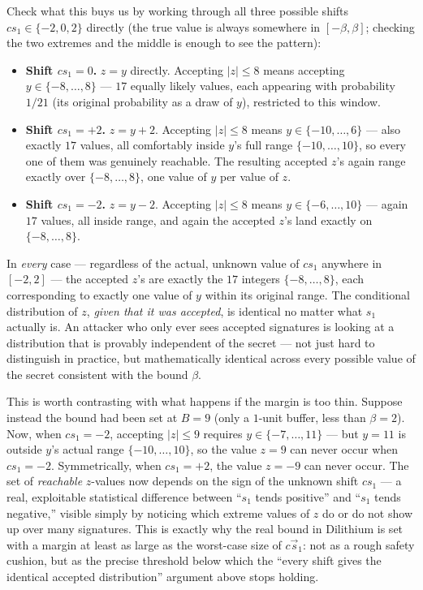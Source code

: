 Check what this buys us by working through all three possible shifts $cs_1 \in \{-2,0,2\}$ directly (the true value is always somewhere in $[-\beta,\beta]$; checking the two extremes and the middle is enough to see the pattern):
\begin{itemize}[leftmargin=*]
  \item \textbf{Shift $cs_1=0$.} $z=y$ directly. Accepting $|z|\le 8$ means accepting $y\in\{-8,\ldots,8\}$ --- $17$ equally likely values, each appearing with probability $1/21$ (its original probability as a draw of $y$), restricted to this window.
  \item \textbf{Shift $cs_1=+2$.} $z=y+2$. Accepting $|z|\le8$ means $y\in\{-10,\ldots,6\}$ --- also exactly $17$ values, all comfortably inside $y$'s full range $\{-10,\ldots,10\}$, so every one of them was genuinely reachable. The resulting accepted $z$'s again range exactly over $\{-8,\ldots,8\}$, one value of $y$ per value of $z$.
  \item \textbf{Shift $cs_1=-2$.} $z=y-2$. Accepting $|z|\le8$ means $y\in\{-6,\ldots,10\}$ --- again $17$ values, all inside range, and again the accepted $z$'s land exactly on $\{-8,\ldots,8\}$.
\end{itemize}
In \emph{every} case --- regardless of the actual, unknown value of $cs_1$ anywhere in $[-2,2]$ --- the accepted $z$'s are exactly the $17$ integers $\{-8,\ldots,8\}$, each corresponding to exactly one value of $y$ within its original range. The conditional distribution of $z$, \emph{given that it was accepted}, is identical no matter what $s_1$ actually is. An attacker who only ever sees accepted signatures is looking at a distribution that is provably independent of the secret --- not just hard to distinguish in practice, but mathematically identical across every possible value of the secret consistent with the bound $\beta$.

This is worth contrasting with what happens if the margin is too thin. Suppose instead the bound had been set at $B=9$ (only a $1$-unit buffer, less than $\beta=2$). Now, when $cs_1=-2$, accepting $|z|\le9$ requires $y\in\{-7,\ldots,11\}$ --- but $y=11$ is outside $y$'s actual range $\{-10,\ldots,10\}$, so the value $z=9$ can never occur when $cs_1=-2$. Symmetrically, when $cs_1=+2$, the value $z=-9$ can never occur. The set of \emph{reachable} $z$-values now depends on the sign of the unknown shift $cs_1$ --- a real, exploitable statistical difference between ``$s_1$ tends positive'' and ``$s_1$ tends negative,'' visible simply by noticing which extreme values of $z$ do or do not show up over many signatures. This is exactly why the real bound in Dilithium is set with a margin at least as large as the worst-case size of $c\vec s_1$: not as a rough safety cushion, but as the precise threshold below which the ``every shift gives the identical accepted distribution'' argument above stops holding.

